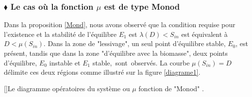 \documentclass[12pt,a4paper]{report}%
\newcounter{proposition}[section] %
\begin{document}
\subsubsection{$\blacklozenge$ Le cas où la fonction $\mu$ est de type Monod}
  Dans la proposition \ref{Mond}, nous avons observé que la condition requise pour l'existence et la stabilité de l'équilibre $E_1$ est $\lambda(D)<S_{in}$ est équivalent à $D <\mu(S_{in})$. Dans la zone de "lessivage", un seul point d'équilibre stable, $E_0$, est présent, tandis que dans la zone "d'équilibre avec la biomasse", deux points d'équilibre,  $E_0$  instable et $E_1$  stable, sont observés. La courbe $ \mu (S_{in}) =D$ délimite ces deux régions comme illustré sur la figure \ref{diagrame1}.
  \begin{center}
[]{Le diagramme opératoires du système ou $\mu$ fonction de "Monod" .}
\label{diagrame1}
\end{center}
  
\end{document}
